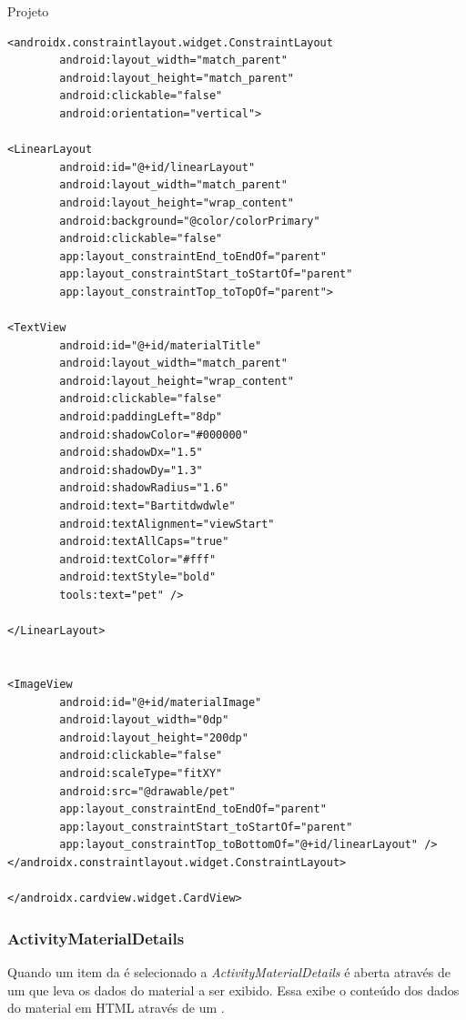 \documentclass[
	12pt,				%
	openright,			%
	twoside,			%
	a4paper,			%
	english,			%
	french,				%
	spanish,			%
	brazil				%
	]{abntex2}
\begin{document}
\begin{chapter}{Projeto}
\begin{lstlisting}[numbers=none,basicstyle=\small,
caption={MaterialLayout.xml},
title={MaterialLayout.xml},
label={MaterialLayout.xml}]
<androidx.constraintlayout.widget.ConstraintLayout
		android:layout_width="match_parent"
		android:layout_height="match_parent"
		android:clickable="false"
		android:orientation="vertical">

<LinearLayout
		android:id="@+id/linearLayout"
		android:layout_width="match_parent"
		android:layout_height="wrap_content"
		android:background="@color/colorPrimary"
		android:clickable="false"
		app:layout_constraintEnd_toEndOf="parent"
		app:layout_constraintStart_toStartOf="parent"
		app:layout_constraintTop_toTopOf="parent">

<TextView
		android:id="@+id/materialTitle"
		android:layout_width="match_parent"
		android:layout_height="wrap_content"
		android:clickable="false"
		android:paddingLeft="8dp"
		android:shadowColor="#000000"
		android:shadowDx="1.5"
		android:shadowDy="1.3"
		android:shadowRadius="1.6"
		android:text="Bartitdwdwle"
		android:textAlignment="viewStart"
		android:textAllCaps="true"
		android:textColor="#fff"
		android:textStyle="bold"
		tools:text="pet" />

</LinearLayout>


<ImageView
		android:id="@+id/materialImage"
		android:layout_width="0dp"
		android:layout_height="200dp"
		android:clickable="false"
		android:scaleType="fitXY"
		android:src="@drawable/pet"
		app:layout_constraintEnd_toEndOf="parent"
		app:layout_constraintStart_toStartOf="parent"
		app:layout_constraintTop_toBottomOf="@+id/linearLayout" />
</androidx.constraintlayout.widget.ConstraintLayout>

</androidx.cardview.widget.CardView>

\end{lstlisting}
\newpage
\subsubsection{ActivityMaterialDetails} \label{ActivityMaterialDetails}
Quando um item da  é selecionado a  \textit{ActivityMaterialDetails} é aberta através de um  que leva os dados do material a ser exibido. Essa  exibe o conteúdo dos dados do material em HTML através de um .


\end{chapter}
\end{document}
